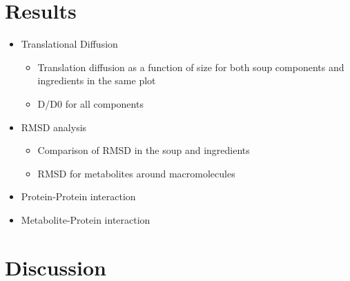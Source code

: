 \documentclass[journal=jacsat,manuscript=article]{achemso}
\begin{document}
\section*{Results}

\begin{itemize}
	\item Translational Diffusion
		\begin{itemize}
			\item Translation diffusion as a function of size for both soup components and ingredients in the same plot
			\item D/D0 for all components
		\end{itemize}
	\item RMSD analysis
		\begin{itemize}
			\item Comparison of RMSD in  the soup and ingredients
			\item RMSD for metabolites around macromolecules
		\end{itemize}
	\item Protein-Protein interaction
	\item Metabolite-Protein interaction
\end{itemize}

 
\section*{Discussion}\label{sec:dissc}
 




 

 
\end{document}
